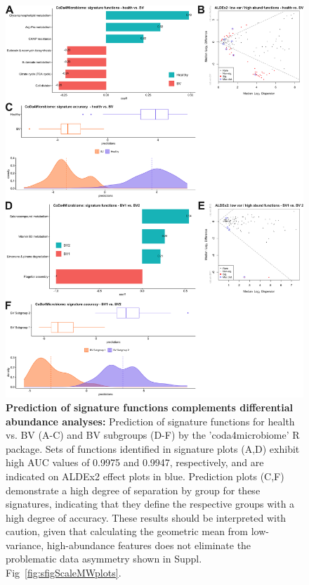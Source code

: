 \documentclass[sn-mathphys,Numbered]{sn-jnl}%
\begin{document}
\begin{figure}[H]
    \centering
    \includegraphics[scale = 0.84]{0_virginia_coda4microbiome_fig.png}
    \caption{\textbf{Prediction of signature functions complements differential abundance analyses:} Prediction of signature functions for health vs. BV (A-C) and BV subgroups (D-F) by the 'coda4microbiome' R package. Sets of functions identified in signature plots (A,D) exhibit high AUC values of 0.9975 and 0.9947, respectively, and are indicated on ALDEx2 effect plots in blue. Prediction plots (C,F) demonstrate a high degree of separation by group for these signatures, indicating that they define the respective groups with a high degree of accuracy. These results should be interpreted with caution, given that calculating the geometric mean from low-variance, high-abundance features does not eliminate the problematic data asymmetry shown in Suppl. Fig~\ref{fig:sfigScaleMWplots}.} \label{fig:sfigVirgCoda4Mfigs}
\end{figure}
\newpage
\end{document}
